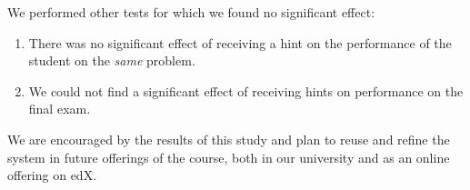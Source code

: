\documentclass{llncs2e/llncs}
\begin{document}
We performed other tests for which we found no significant effect:
\begin{enumerate}
\item There was no significant effect of receiving a hint on the performance of the student on the {\em same} problem.
\item We could not find a significant effect of receiving hints on performance on the final exam.
\end{enumerate}

We are encouraged by the results of this study and plan to reuse and refine the system in future offerings of the course, both in our
university and as an online offering on edX.



\end{document}
